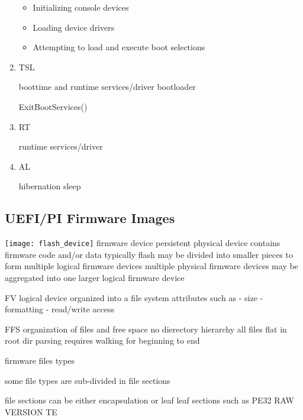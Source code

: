 \begin{enumerate}
    \begin{itemize}
        \item Initializing console devices
        \item Loading device drivers
        \item Attempting to load and execute boot selections
    \end{itemize}

    \item{\acf{TSL}}

    boottime and runtime services/driver
    bootloader
    \cite[13.3 System Partition]{uefi-spec}
    \cite[3.5.1.1]{uefi-spec}

    ExitBootServices()

    \item{\acf{RT}}

    runtime services/driver

    \item{\acf{AL}}

    hibernation
    sleep

\end{enumerate}

\subsection{\acs{UEFI}/\acs{PI} Firmware Images}

\cite[Volume 3, 2.1]{pi-spec}

\texttt{[image: flash\_device]}
firmware device
persistent
physical device
contains firmware code and/or data
typically flash
may be divided into smaller pieces to form multiple logical firmware devices
multiple physical firmware devices may be aggregated into one larger logical firmware device

\acf{FV}
logical device
organized into a file system
attributes such as
- size
- formatting
- read/write access

\acf{FFS}
organization of files and free space
no dierectory hierarchy
all files flat in root dir
parsing requires walking for beginning to end

firmware files
types

some file types are sub-divided in file sections

file sections can be either
encapsulation or leaf
leaf sections such as
PE32
RAW
VERSION
TE

